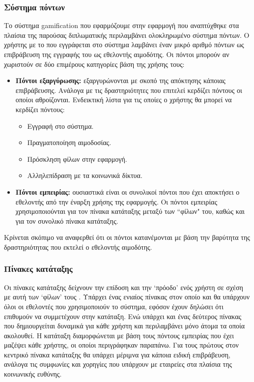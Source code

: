 	\subsubsection{Σύστημα πόντων}\label{sssect:point_system}
	
	Το σύστημα gamification που εφαρμόζουμε στην εφαρμογή που αναπτύχθηκε στα πλαίσια της παρούσας διπλωματικής περιλαμβάνει ολοκληρωμένο σύστημα πόντων. Ο χρήστης με το που εγγράφεται στο σύστημα λαμβάνει έναν μικρό αριθμό πόντων ως επιβράβευση της εγγραφής του ως εθελοντής αιμοδότης. Οι πόντοι μπορούν αν χωριστούν σε δύο επιμέρους κατηγορίες βάση της χρήσης τους:

	\begin{itemize}
		\item \textbf{Πόντοι εξαργύρωσης:} εξαργυρώνονται με σκοπό της απόκτησης κάποιας επιβράβευσης. Ανάλογα με τις δραστηριότητες που επιτελεί κερδίζει πόντους οι οποίοι αθροίζονται. Ενδεικτική λίστα για τις οποίες ο χρήστης θα μπορεί να κερδίζει πόντους:
		\begin{itemize}
			\item Εγγραφή στο σύστημα.
			\item Πραγματοποίηση αιμοδοσίας.
			\item Πρόσκληση φίλων στην εφαρμογή.
			\item Αλληλεπίδραση με τα κοινωνικά δίκτυα.
		\end{itemize}
		\item \textbf{Πόντοι εμπειρίας:} ουσιαστικά είναι οι συνολικοί πόντοι που έχει αποκτήσει ο εθελοντής από την έναρξη χρήσης της εφαρμογής. Οι πόντοι εμπειρίας χρησιμοποιούνται για τον πίνακα κατάταξης μεταξύ των ``φίλων" του, καθώς και για τον συνολικό πίνακα κατάταξης.
	\end{itemize}
	Κρίνεται σκόπιμο να αναφερθεί ότι οι πόντοι κατανέμονται με βάση την βαρύτητα της δραστηριότητας που εκτελεί ο εθελοντής αιμοδότης.
	
	\subsubsection{Πίνακες κατάταξης}
	
	Οι πίνακες κατάταξης δείχνουν την επίδοση και την `πρόοδο' ενός χρήστη σε σχέση με αυτή των `φίλων' τους \cite{Liu:2011:GIE:2072652.2072655}. Υπάρχει ένας ενιαίος πίνακας στον οποίο και θα υπάρχουν όλοι οι εθελοντές που χρησιμοποιούν το σύστημα, εφόσον έχουν δηλώσει ότι επιθυμούν να συμμετέχουν στην κατάταξη. Ενώ υπάρχει και ένας δεύτερος πίνακας που δημιουργείται δυναμικά για κάθε χρήστη και περιλαμβάνει μόνο άτομα τα οποία ακολουθεί. Η κατάταξη διαμορφώνεται με βάση τους πόντους εμπειρίας που έχει μαζέψει κάθε χρήστης, οι οποίοι περιγράφηκαν παραπάνω. Για τους πρώτους στον κεντρικό πίνακα κατάταξης θα υπάρχει μέριμνα για κάποια ειδική επιβράβευση, ανάλογα τις συμφωνίες και χορηγίες που υπάρχουν με εταιρείες στα πλαίσια της κοινωνικής ευθύνης.
	
